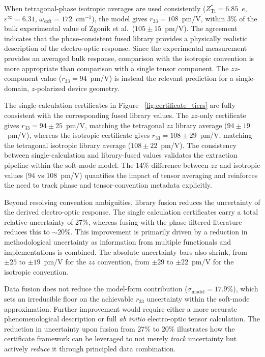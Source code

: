 \documentclass[prb,twocolumn,superscriptaddress,amsmath,amssymb,longbibliography]{revtex4-2}
\begin{document}
When tetragonal-phase isotropic averages are used consistently 
($Z^*_{\mathrm{Ti}} = 6.85$~$e$, $\varepsilon^\infty = 6.31$, 
$\omega_{\mathrm{soft}} = 172$~cm$^{-1}$), the model gives 
$r_{33} = 108$~pm/V, within 3\% of the bulk experimental value of 
Zgonik et al.\ ($105 \pm 15$~pm/V). The agreement indicates that the phase-consistent fused library provides a physically realistic description of the electro-optic response. Since the experimental measurement provides an averaged bulk response, comparison with the isotropic convention is more appropriate than comparison with a single tensor component. The $zz$-component 
value ($r_{33} = 94$~pm/V) is instead the relevant prediction for a 
single-domain, $z$-polarized device geometry.

The single-calculation certificates in Figure ~\ref{fig:certificate_tiers} are fully consistent with the corresponding fused library values.  
The $zz$-only certificate gives $r_{33} = 94 \pm 25$~pm/V, 
matching the tetragonal $zz$ library average ($94 \pm 19$~pm/V), whereas 
the isotropic certificate gives $r_{33} = 108 \pm 29$~pm/V, matching 
the tetragonal isotropic library average ($108 \pm 22$~pm/V). The consistency 
between single-calculation and library-fused values validates the extraction pipeline within the 
soft-mode model. The 14\% difference between $zz$ and isotropic values 
($94$ vs $108$~pm/V) quantifies the impact of tensor averaging and 
reinforces the need to track phase and tensor-convention metadata explicitly. 

Beyond resolving convention ambiguities, library fusion reduces the uncertainty of the derived electro-optic response.
The single calculation certificates carry a total relative uncertainty of  
 27\%, whereas fusing with the phase-filtered literature reduces this 
to $\sim$20\%. This improvement is primarily driven by 
a reduction in methodological uncertainty as information from multiple functionals and implementations is combined. The absolute uncertainty bars also shrink, from 
$\pm 25$ to $\pm 19$~pm/V for the $zz$ convention, from $\pm 29$ to 
$\pm 22$~pm/V for the isotropic convention. 

Data fusion does not reduce the 
model-form contribution ($\sigma_{\mathrm{model}} = 17.9\%$), which sets an 
irreducible floor on the achievable $r_{33}$ uncertainty within the 
soft-mode approximation. Further improvement would require either  a more accurate 
phenomenological description or full \emph{ab initio} electro-optic tensor calculation. 
The reduction in uncertainty upon fusion from 27\% to 20\%  illustrates how  the 
certificate framework can be leveraged to not merely \emph{track} uncertainty but actively 
\emph{reduce} it through principled data combination.
\end{document}
